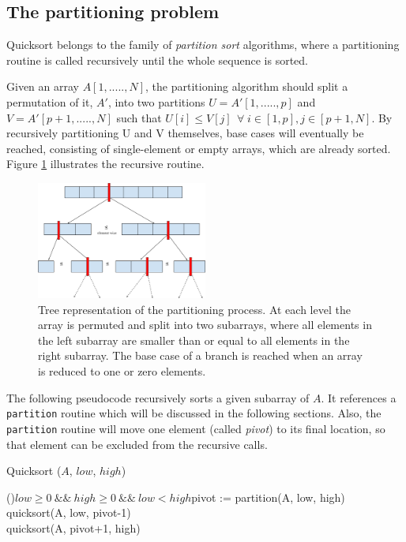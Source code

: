 \documentclass[]{finalproject}
\begin{document}
\subsection{The partitioning problem}

Quicksort belongs to the family of \textit{partition sort} algorithms, where a partitioning routine is called recursively until the whole sequence is sorted.

Given an array $A[1,.....,N]$, the partitioning algorithm should split a permutation of it, $A'$, into two partitions $U=A'[1,.....,p]$ and $V=A'[p+1,.....,N]$ such that $U[i] \leq V[j] \;\, \forall \; i \in [1,p], j \in [p+1,N]$. By recursively partitioning U and V themselves, base cases will eventually be reached, consisting of single-element or empty arrays, which are already sorted. Figure \ref{fig:rec-part} illustrates the recursive routine.

\begin{figure}[H]
\centering
\includegraphics[width=0.5\textwidth]{recursive_partitioning.png}
\caption{Tree representation of the partitioning process.
At each level the array is permuted and split into two subarrays, where all elements in the left subarray are smaller than or equal to all elements in the right subarray.
The base case of a branch is reached when an array is reduced to one or zero elements.}
\label{fig:rec-part}
\end{figure}

The following pseudocode recursively sorts a given subarray of $A$. It references a \texttt{partition} routine which will be discussed in the following sections. Also, the \texttt{partition} routine will move one element (called \textit{pivot}) to its final location, so that element can be excluded from the recursive calls.

\begin{algorithm}
\caption{Quicksort ($A$, $low$, $high$)}
\label{alg:p1}
\If(){$low \geq 0 ~\&\&~ high \geq 0 ~\&\&~ low < high$}{pivot := partition(A, low, high)\\
quicksort(A, low, pivot-1)\\
quicksort(A, pivot+1, high)}
\end{algorithm}
\end{document}
